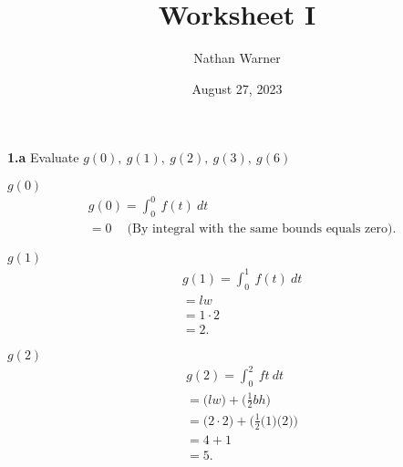 \documentclass{report}
\title{\Huge{Worksheet I}}
\author{\huge{Nathan Warner}}
\date{\huge{August 27, 2023}}
\begin{document}
    \pagebreak \bigbreak \noindent
   \textbf{1.a} Evaluate $g(0),\ g(1),\ g(2),\ g(3),\ g(6)$ 
   \bigbreak \noindent 

   $g(0)$
   \begin{align*}
       &g(0) = \int_{0}^{0}\ f(t) \ dt \\
       &= 0\ \quad \text{(By integral with the same bounds equals zero)} 
   .\end{align*}
   \bigbreak \noindent 

   \textbf{$g(1)$}
   \begin{align*}
      &g(1) = \int_{0}^{1}\ f(t)\ dt \\ 
       &= lw  \\
       &= 1\cdot 2 \\
       &= 2
   .\end{align*}
   \bigbreak \noindent 

   $g(2) $
   \begin{align*}
       &g(2) = \int_{0}^{2}\ ft\ dt \\
       &= \bigg(lw\bigg)+\bigg(\frac{1}{2}bh\bigg) \\
       &=\bigg(2\cdot 2\bigg) + \bigg(\frac{1}{2}\bigg(1\bigg)\bigg(2\bigg)\bigg) \\
       &=4+1 \\
       &=5
   .\end{align*}
   \bigbreak \noindent 
\end{document}
